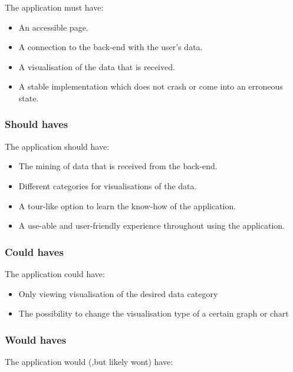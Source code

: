 \documentclass{article}
\begin{document}
    The application must have:
    
    \begin{itemize}
        \item An accessible page.
        \item A connection to the back-end with the user's data.
        \item A visualisation of the data that is received.
        \item A stable implementation which does not crash or come into an erroneous state.
    \end{itemize}
    
    \subsubsection{Should haves}
    
    The application should have:
    
    \begin{itemize}
        \item The mining of data that is received from the back-end.
        \item Different categories for visualisations of the data.
        \item A tour-like option to learn the know-how of the application.
        \item A use-able and user-friendly experience throughout using the application.
    \end{itemize}
    
    \subsubsection{Could haves}
    
    The application could have:
    
    \begin{itemize}
        \item Only viewing visualisation of the desired data category
        \item The possibility to change the visualisation type of a certain graph or chart
    \end{itemize}
    
    \subsubsection{Would haves}
    
    The application would (,but likely wont) have:
    
\end{document}
